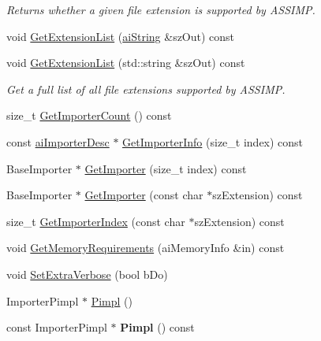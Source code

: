 \begin{DoxyCompactItemize}
\begin{DoxyCompactList}\small\item\em Returns whether a given file extension is supported by A\+S\+S\+I\+MP. \end{DoxyCompactList}\item 
void \hyperlink{class_assimp_1_1_importer_a23c85647f7977012d9fef20b36c2d579}{Get\+Extension\+List} (\hyperlink{structai_string}{ai\+String} \&sz\+Out) const 
\item 
void \hyperlink{class_assimp_1_1_importer_a6ab684351c55e170de3c5b7d730b306d}{Get\+Extension\+List} (std\+::string \&sz\+Out) const 
\begin{DoxyCompactList}\small\item\em Get a full list of all file extensions supported by A\+S\+S\+I\+MP. \end{DoxyCompactList}\item 
size\+\_\+t \hyperlink{class_assimp_1_1_importer_afe982451f1a1c9b0b59c788f9329ccc1}{Get\+Importer\+Count} () const 
\item 
const \hyperlink{structai_importer_desc}{ai\+Importer\+Desc} $\ast$ \hyperlink{class_assimp_1_1_importer_a857dd22e071521c7747dc909f6a8f6f9}{Get\+Importer\+Info} (size\+\_\+t index) const 
\item 
Base\+Importer $\ast$ \hyperlink{class_assimp_1_1_importer_a712a0545a11c9d198392867552ba6646}{Get\+Importer} (size\+\_\+t index) const 
\item 
Base\+Importer $\ast$ \hyperlink{class_assimp_1_1_importer_a18921ab411273fa95961f60848ad6007}{Get\+Importer} (const char $\ast$sz\+Extension) const 
\item 
size\+\_\+t \hyperlink{class_assimp_1_1_importer_aee103460f66b9cbe3143400ec92ffc56}{Get\+Importer\+Index} (const char $\ast$sz\+Extension) const 
\item 
void \hyperlink{class_assimp_1_1_importer_aba2eacd0b627cb481b6d66d9ca55eac9}{Get\+Memory\+Requirements} (ai\+Memory\+Info \&in) const 
\item 
void \hyperlink{class_assimp_1_1_importer_a9bb793072c84c784279d0f6e870bb42d}{Set\+Extra\+Verbose} (bool b\+Do)
\item 
Importer\+Pimpl $\ast$ \hyperlink{class_assimp_1_1_importer_ac112839f323a630f83395acb74746827}{Pimpl} ()
\item 
const Importer\+Pimpl $\ast$ {\bfseries Pimpl} () const \hypertarget{class_assimp_1_1_importer_a6bf9560ac8b1353ae809ff1d99c9c661}{}\label{class_assimp_1_1_importer_a6bf9560ac8b1353ae809ff1d99c9c661}

\end{DoxyCompactItemize}
